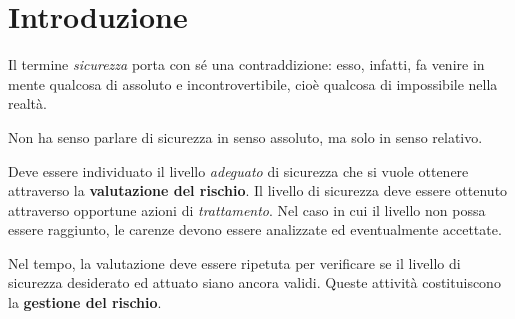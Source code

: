 \chapter{Introduzione}

Il termine \textit{sicurezza} porta con sé una contraddizione: esso, infatti,
fa venire in mente qualcosa di assoluto e incontrovertibile, cioè qualcosa
di impossibile nella realtà.

Non ha senso parlare di sicurezza in senso assoluto, ma solo in senso relativo.

Deve essere individuato il livello \textit{adeguato} di sicurezza che si vuole
ottenere attraverso la \textbf{valutazione del rischio}. Il livello di sicurezza
deve essere ottenuto attraverso opportune azioni di \textit{trattamento}. Nel caso in cui
il livello non possa essere raggiunto, le carenze devono essere analizzate ed
eventualmente accettate.

Nel tempo, la valutazione deve essere ripetuta per verificare se il livello di sicurezza
desiderato ed attuato siano ancora validi. Queste attività costituiscono la
\textbf{gestione del rischio}.
